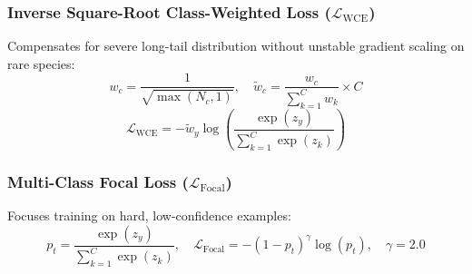 \documentclass[11pt,a4paper]{article}
\begin{document}
\subsubsection{\texorpdfstring{Inverse Square-Root Class-Weighted Loss ($\mathcal{L}_{\text{WCE}}$)}{Inverse Square-Root Class-Weighted Loss}}
Compensates for severe long-tail distribution without unstable gradient scaling on rare species:
\begin{equation}
    w_c = \frac{1}{\sqrt{\max(N_c, 1)}}, \quad \tilde{w}_c = \frac{w_c}{\sum_{k=1}^C w_k} \times C
\end{equation}
\begin{equation}
    \mathcal{L}_{\text{WCE}} = - \tilde{w}_y \log \left( \frac{\exp(z_y)}{\sum_{k=1}^C \exp(z_k)} \right)
\end{equation}

\subsubsection{\texorpdfstring{Multi-Class Focal Loss ($\mathcal{L}_{\text{Focal}}$)}{Multi-Class Focal Loss}}
Focuses training on hard, low-confidence examples:
\begin{equation}
    p_t = \frac{\exp(z_y)}{\sum_{k=1}^C \exp(z_k)}, \quad \mathcal{L}_{\text{Focal}} = - (1 - p_t)^\gamma \log(p_t), \quad \gamma = 2.0
\end{equation}
\end{document}
